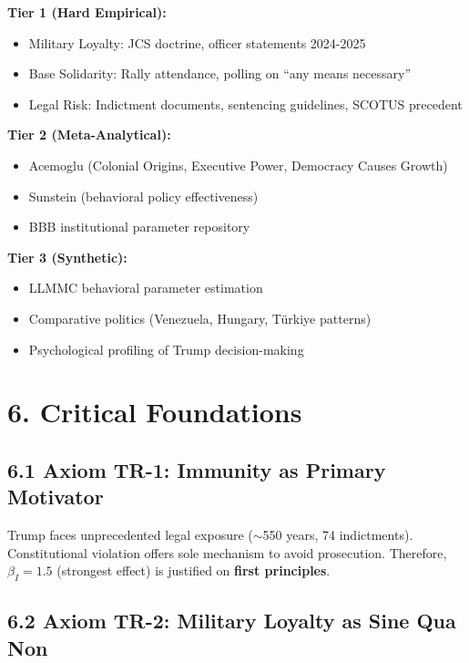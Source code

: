 \documentclass[11pt]{article}
\begin{document}
\textbf{Tier 1 (Hard Empirical):}
\begin{itemize}
\item Military Loyalty: JCS doctrine, officer statements 2024-2025
\item Base Solidarity: Rally attendance, polling on ``any means necessary''
\item Legal Risk: Indictment documents, sentencing guidelines, SCOTUS precedent
\end{itemize}

\textbf{Tier 2 (Meta-Analytical):}
\begin{itemize}
\item Acemoglu (Colonial Origins, Executive Power, Democracy Causes Growth)
\item Sunstein (behavioral policy effectiveness)
\item BBB institutional parameter repository
\end{itemize}

\textbf{Tier 3 (Synthetic):}
\begin{itemize}
\item LLMMC behavioral parameter estimation
\item Comparative politics (Venezuela, Hungary, Türkiye patterns)
\item Psychological profiling of Trump decision-making
\end{itemize}

\section{6. Critical Foundations}

\subsection{6.1 Axiom TR-1: Immunity as Primary Motivator}

\begin{fancybox}
Trump faces unprecedented legal exposure ($\sim$550 years, 74 indictments). Constitutional violation offers sole mechanism to avoid prosecution. Therefore, $\beta_I = 1.5$ (strongest effect) is justified on \textbf{first principles}.
\end{fancybox}

\subsection{6.2 Axiom TR-2: Military Loyalty as Sine Qua Non}
\end{document}
